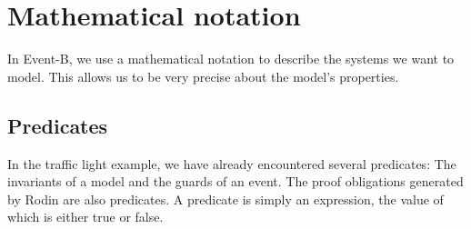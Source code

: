 \newcommand{\lascii}[1]{\qquad\quad \textrm{ASCII: } \texttt{#1}}
\newcommand{\inascii}[1]{(ASCII: \texttt{#1})}

\section{Mathematical notation}
\label{tut_mathematical_notation}
In Event-B, we use a mathematical notation to describe the systems we want to model.
This allows us to be very precise about the model's properties.

\subsection{Predicates}
\label{tut_predicates}
In the traffic light example, we have already encountered several predicates: The invariants of a model and the guards of an event. The proof obligations generated by Rodin are also predicates.  A predicate is simply an expression, the value of which is either true or false.

